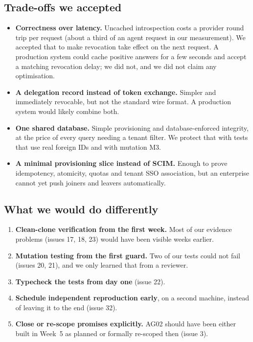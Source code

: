 \subsection{Trade-offs we accepted}
\begin{itemize}
  \item \textbf{Correctness over latency.} Uncached introspection costs a provider round trip per request (about a third of an agent request in our measurement). We accepted that to make revocation take effect on the next request. A production system could cache positive answers for a few seconds and accept a matching revocation delay; we did not, and we did not claim any optimisation.
  \item \textbf{A delegation record instead of token exchange.} Simpler and immediately revocable, but not the standard wire format. A production system would likely combine both.
  \item \textbf{One shared database.} Simple provisioning and database-enforced integrity, at the price of every query needing a tenant filter. We protect that with tests that use real foreign IDs and with mutation M3.
  \item \textbf{A minimal provisioning slice instead of SCIM.} Enough to prove idempotency, atomicity, quotas and tenant SSO association, but an enterprise cannot yet push joiners and leavers automatically.
\end{itemize}

\subsection{What we would do differently}
\begin{enumerate}
  \item \textbf{Clean-clone verification from the first week.} Most of our evidence problems (issues 17, 18, 23) would have been visible weeks earlier.
  \item \textbf{Mutation testing from the first guard.} Two of our tests could not fail (issues 20, 21), and we only learned that from a reviewer.
  \item \textbf{Typecheck the tests from day one} (issue 22).
  \item \textbf{Schedule independent reproduction early}, on a second machine, instead of leaving it to the end (issue 32).
  \item \textbf{Close or re-scope promises explicitly.} AG02 should have been either built in Week~5 as planned or formally re-scoped then (issue 3).
\end{enumerate}

